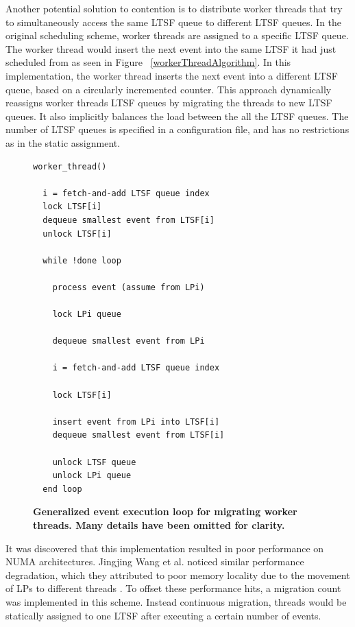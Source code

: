 \documentclass[11pt]{book}
\begin{document}
Another potential solution to contention is to distribute worker threads that
try to simultaneously access the same LTSF queue to different LTSF queues.  In
the original scheduling scheme, worker threads are assigned to a specific LTSF
queue.  The worker thread would insert the next event into the same LTSF it had
just scheduled from as seen in Figure ~\ref{workerThreadAlgorithm}.  In this
implementation, the worker thread inserts the next event into a different LTSF
queue, based on a circularly incremented counter.  This approach dynamically
reassigns worker threads LTSF queues by migrating the threads to new LTSF
queues.  It also implicitly balances the load between the all the LTSF queues.
The number of LTSF queues is specified in a configuration file, and has no
restrictions as in the static assignment.

\linespread{1.0}
\begin{figure}
\begin{verbatim}
worker_thread()

  i = fetch-and-add LTSF queue index
  lock LTSF[i]
  dequeue smallest event from LTSF[i]
  unlock LTSF[i]

  while !done loop

    process event (assume from LPi)

    lock LPi queue
    
    dequeue smallest event from LPi

    i = fetch-and-add LTSF queue index

    lock LTSF[i]

    insert event from LPi into LTSF[i]
    dequeue smallest event from LTSF[i]

    unlock LTSF queue
    unlock LPi queue
  end loop
\end{verbatim}
\caption{\textbf{Generalized event execution loop for migrating worker threads.  Many
    details have been omitted for clarity.}}\label{migratinWorkerThreadAlgorithm}
\end{figure}

It was discovered that this implementation resulted in poor performance on NUMA
architectures.  Jingjing Wang et al. noticed similar performance degradation, which they
attributed to poor memory locality due to the movement of LPs to different threads
\cite{numa}.  To offset these performance hits, a migration count was implemented in this
scheme.  Instead continuous migration, threads would be statically assigned to one LTSF
after executing a certain number of events.
\end{document}
